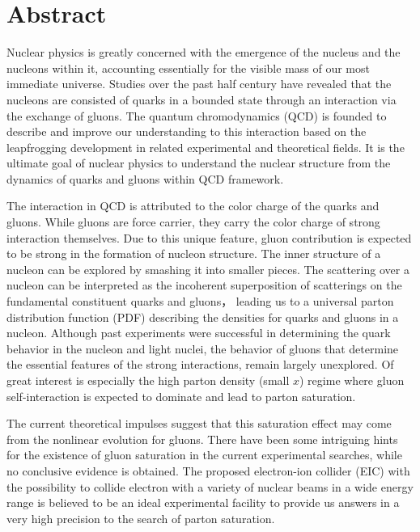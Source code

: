\chapter*{\LARGE \bfseries {Abstract}}

\normalsize { 

Nuclear physics is greatly concerned with the emergence of the nucleus
and the nucleons within it, accounting essentially for the visible mass of our
most immediate universe. Studies over the past half century have revealed that
the nucleons are consisted of quarks in a bounded state through an interaction
via the exchange of gluons. The quantum chromodynamics (QCD) is founded to
describe and improve our understanding to this interaction based on the
leapfrogging development in related experimental and theoretical fields. It is
the ultimate goal of nuclear physics to understand the nuclear structure from
the dynamics of quarks and gluons within QCD framework.

The interaction in QCD is attributed to the color charge of the quarks
and gluons. While gluons are force carrier, they carry the color charge of strong interaction themselves.
Due to this unique feature, gluon contribution is expected to be strong in the
formation of nucleon structure. The inner structure of a nucleon can be explored
by smashing it into smaller pieces. The scattering over a nucleon can be interpreted
as the incoherent superposition of scatterings on the fundamental constituent
quarks and gluons， leading us to a universal parton distribution function (PDF)
describing the densities for quarks and gluons in a nucleon. Although past
experiments were successful in determining the quark behavior in the nucleon and
light nuclei, the behavior of gluons that determine the essential features of the strong
interactions, remain largely unexplored. Of great interest is especially the
high parton density (small $x$) regime where gluon self-interaction is expected to
dominate and lead to parton saturation. 

The current theoretical impulses suggest that this saturation effect may come
from the nonlinear evolution for gluons. There have been some intriguing hints
for the existence of gluon saturation in the current experimental searches, while
no conclusive evidence is obtained. The proposed electron-ion collider (EIC) with
the possibility to collide electron with a variety of nuclear beams in a wide energy range is
believed to be an ideal experimental facility to provide us answers in a very high
precision to the search of parton saturation.

}
